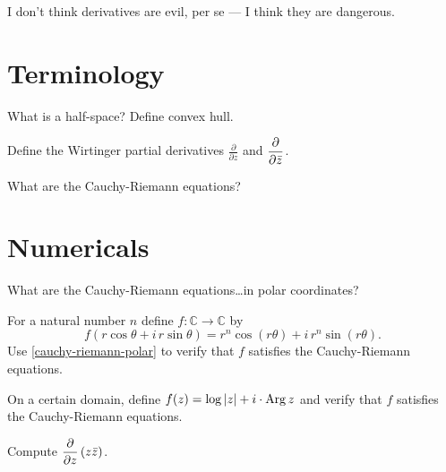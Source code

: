 \documentclass{homework}
\author{Jim Fowler}
\begin{document}
\maketitle

\begin{inspiration}
I don't think derivatives are evil, per se --- I think they are dangerous.
\end{inspiration}

\section{Terminology}

\begin{problem}
  What is a half-space?  Define convex hull.
\end{problem}

\begin{problem}
  Define the Wirtinger partial derivatives $\displaystyle\frac{\partial}{\partial z}$ and $\displaystyle\frac{\partial}{\partial \bar{z}}$.
\end{problem}

\begin{problem}
  What are the Cauchy-Riemann equations?
\end{problem}

\section{Numericals}

\begin{problem}\label{cauchy-riemann-polar}What are the Cauchy-Riemann equations\ldots in polar coordinates?
\end{problem}

\begin{problem}
  For a natural number $n$ define $f : \mathbb{C} \to \mathbb{C}$ by
  \[
    f(r \cos \theta + i \, r\sin \theta) = r^n \cos \left( r\theta \right) + i \, r^n \sin \left( r \theta \right).
  \]
  Use \ref{cauchy-riemann-polar} to verify that $f$ satisfies the
  Cauchy-Riemann equations.
\end{problem}

\begin{problem}
  On a certain domain, define $f(z) = \log \left|z\right| + i \cdot \operatorname{Arg} z$
  and verify that $f$ satisfies the Cauchy-Riemann equations.
\end{problem}

\begin{problem}
  Compute $\displaystyle\frac{\partial}{\partial z} \left( z \bar{z} \right)$.
\end{problem}
\end{document}
